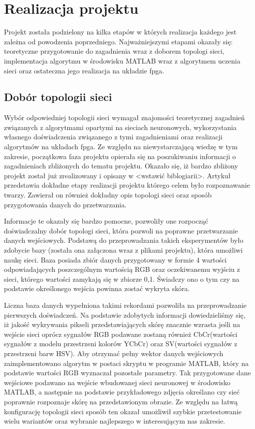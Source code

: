 \chapter{Realizacja projektu}
\label{cha:realizacja}

Projekt została podzielony na kilka etapów w których realizacja każdego jest zależna od powodzenia poprzedniego. Najważniejszymi etapami okazały się: teoretyczne przygotowanie do zagadnienia wraz z doborem topologi sieci, implementacja algorytmu w środowisku MATLAB wraz z algorytmem uczenia sieci oraz ostateczna jego realizacja na układzie fpga. 
\section{Dobór topologii sieci}

Wybór odpowiedniej topologii sieci wymagał znajomości teoretycznej zagadnień związanych z algorytmami opartymi na sieciach neuronowych, wykorzystania własnego doświadczenia związanego z tymi zagadnieniami oraz realizacji algorytmów na układach fpga. Ze względu na niewystarczającą wiedzę w tym zakresie, początkowa faza projektu opierała się na poszukiwaniu informacji o zagadnieniach zbliżonych do tematu projektu. Okazało się, iż bardzo zbliżony projekt został już zrealizowany i opisany w <wstawić biblogiarii>. Artykuł przedstawia dokładne etapy realizacji projektu którego celem było rozpoznawanie twarzy. Zawierał on również dokładny opis topologi sieci oraz sposób przygotowania danych do przetwarzania. 

Informacje te okazały się bardzo pomocne, pozwoliły one rozpocząć doświadczalny dobór topologi sieci, która pozwoli na poprawne przetwarzanie danych wejściowych. 
Podstawą do przeprowadzania takich eksperymentów było zdobycie bazy (została ona załączona wraz z plikami projektu), która umożliwi naukę sieci. Baza posiada zbiór danych przygotowany w formie 4 wartości odpowiadających poszczególnym wartością RGB oraz oczekiwanemu wyjściu z sieci, którego wartości zamykają się w zbiorze {0,1}. Świadczy ono o tym czy na podstawie określonego wejścia powinna zostać wykryta skóra.

Liczna baza danych wypełniona takimi rekordami pozwoliła na przeprowadzanie pierwszych doświadczeń. Na podstawie zdobytych informacji dowiedzieliśmy się, iż jakość wykrywania pikseli przedstawiających skórę znacznie wzrasta jeśli na wejście sieci oprócz sygnałów RGB podawane zostaną również CbCr(wartości sygnałów z modelu przestrzeni kolorów YCbCr) oraz SV(wartości sygnałów z przestrzeni barw HSV). Aby otrzymać pełny wektor danych wejściowych zaimplementowano algorytm w postaci skryptu w programie MATLAB, który na podstawie wartości RGB wyznaczał pozostałe parametry. Tak przygotowane dane wejściowe podawano na wejście wbudowanej sieci neuronowej w środowisko MATLAB, a następnie na podstawie przykładowego zdjęcia określano czy sieć poprawnie rozpoznaje skórę na przedstawionym obrazie. Ze względu na łatwą konfigurację topologii sieci sposób ten okazał umożliwił szybkie przetestowanie wielu wariantów oraz wybranie najlepszego w interesującym nas zakresie.

